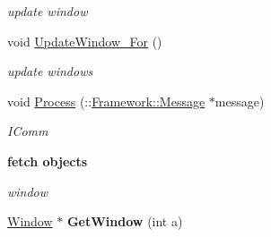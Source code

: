 \begin{DoxyCompactItemize}
\begin{DoxyCompactList}\small\item\em update window \item\end{DoxyCompactList}\item 
\hypertarget{classPlatform_1_1Platform_a68a12a5b95969a258959003b941e5ef1}{
void \hyperlink{classPlatform_1_1Platform_a68a12a5b95969a258959003b941e5ef1}{UpdateWindow\_\-For} ()}
\label{classPlatform_1_1Platform_a68a12a5b95969a258959003b941e5ef1}

\begin{DoxyCompactList}\small\item\em update windows \item\end{DoxyCompactList}\item 
\hypertarget{classPlatform_1_1Platform_ad630a81931ff86622e545c6f3aac325a}{
void \hyperlink{classPlatform_1_1Platform_ad630a81931ff86622e545c6f3aac325a}{Process} (::\hyperlink{structFramework_1_1Message}{Framework::Message} $\ast$message)}
\label{classPlatform_1_1Platform_ad630a81931ff86622e545c6f3aac325a}

\begin{DoxyCompactList}\small\item\em IComm \item\end{DoxyCompactList}\end{DoxyCompactItemize}
\begin{Indent}{\bf fetch objects}\par
{\em \label{_amgrpb712734d7b6a37d417e36727149b52a3}
 window }\begin{DoxyCompactItemize}
\item 
\hypertarget{classPlatform_1_1Platform_a8d614b9eaf952264d0836df2d828811b}{
\hyperlink{classPlatform_1_1Window}{Window} $\ast$ {\bfseries GetWindow} (int a)}
\label{classPlatform_1_1Platform_a8d614b9eaf952264d0836df2d828811b}

\end{DoxyCompactItemize}
\end{Indent}
